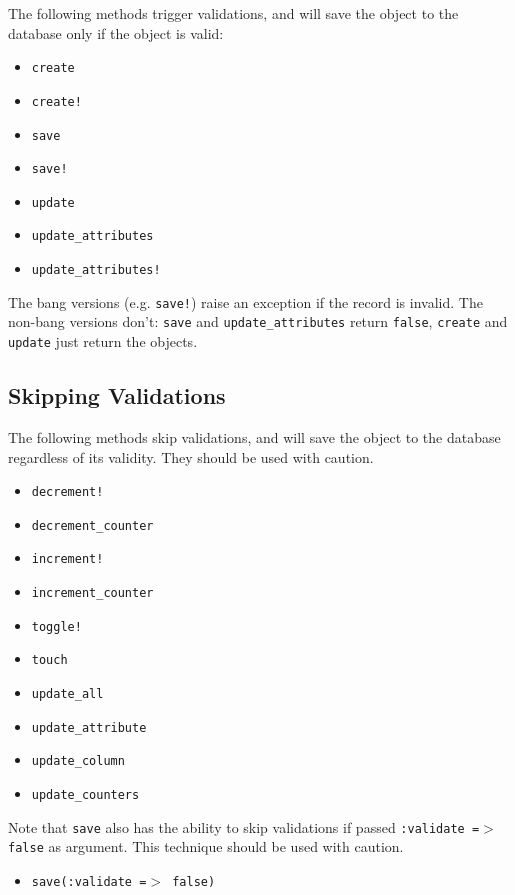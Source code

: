 \documentclass[10pt]{book}
\begin{document}
The following methods trigger validations, and will save the object to the database only if the object is valid:
\begin{itemize}
	\item \texttt{create}
	\item \texttt{create!}
	\item \texttt{save}
	\item \texttt{save!}
	\item \texttt{update}
	\item \texttt{update\_attributes}
	\item \texttt{update\_attributes!}
\end{itemize}

The bang versions (e.g. \texttt{save!}) raise an exception if the record is invalid. The non-bang versions don’t: \texttt{save} and \texttt{update\_attributes} return \texttt{false}, \texttt{create} and \texttt{update} just return the objects.

\subsection{ Skipping Validations}

The following methods skip validations, and will save the object to  the database regardless of its validity. They should be used with  caution.
\begin{itemize}
	\item \texttt{decrement!}
	\item \texttt{decrement\_counter}
	\item \texttt{increment!}
	\item \texttt{increment\_counter}
	\item \texttt{toggle!}
	\item \texttt{touch}
	\item \texttt{update\_all}
	\item \texttt{update\_attribute}
	\item \texttt{update\_column}
	\item \texttt{update\_counters}
\end{itemize}

Note that \texttt{save} also has the ability to skip validations if passed \texttt{:validate =$>$ false} as argument. This technique should be used with caution.
\begin{itemize}
	\item \texttt{save(:validate =$>$ false)}
\end{itemize}
\end{document}
